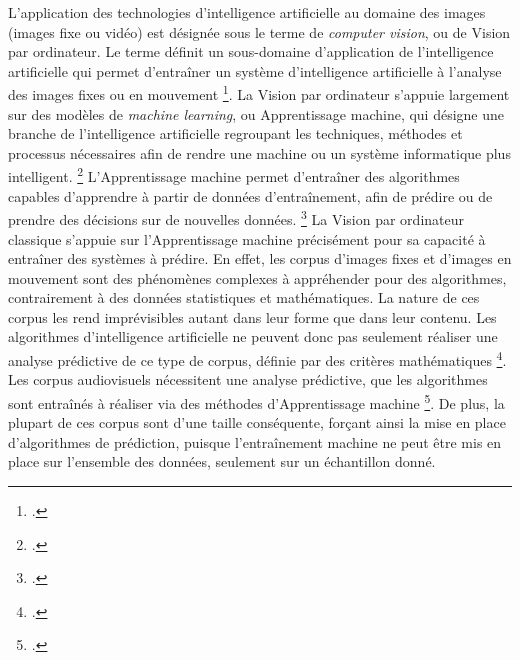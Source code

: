 

L’application des technologies d’intelligence artificielle au domaine des images (images fixe ou vidéo) est désignée sous le terme de \textit{computer vision}, ou de \gls{Vision par ordinateur}. Le terme définit un sous-domaine d’application de l’intelligence artificielle qui permet d’entraîner un système d’intelligence artificielle à l’analyse des images fixes ou en mouvement \footcite{stryker2025}. La \gls{Vision par ordinateur} s’appuie largement sur des modèles de \textit{machine learning}, ou \gls{Apprentissage machine}, qui désigne une branche de l'intelligence artificielle regroupant les techniques, méthodes et processus nécessaires afin de rendre une machine ou un système informatique plus intelligent. \footcite{zotero-item-584} L'\gls{Apprentissage machine} permet d’entraîner des algorithmes capables d’apprendre à partir de données d’entraînement, afin de prédire ou de prendre des décisions sur de nouvelles données. \footcite{zotero-item-702} La \gls{Vision par ordinateur} classique s’appuie sur l’\gls{Apprentissage machine} précisément pour sa capacité à entraîner des systèmes à prédire. En effet, les corpus d’images fixes et d’images en mouvement sont des phénomènes complexes à appréhender pour des algorithmes, contrairement à des données statistiques et mathématiques. La nature de ces corpus les rend imprévisibles autant dans leur forme que dans leur contenu. Les algorithmes d’intelligence artificielle ne peuvent donc pas seulement réaliser une analyse prédictive de ce type de corpus, définie par des critères mathématiques \footcite{mahony2020}. Les corpus audiovisuels nécessitent une analyse prédictive, que les algorithmes sont entraînés à réaliser via des méthodes d'\gls{Apprentissage machine} \footcite{mahony2020}. De plus, la plupart de ces corpus sont d’une taille conséquente, forçant ainsi la mise en place d'algorithmes de prédiction, puisque l’entraînement machine ne peut être mis en place sur l’ensemble des données, seulement sur un échantillon donné. 

